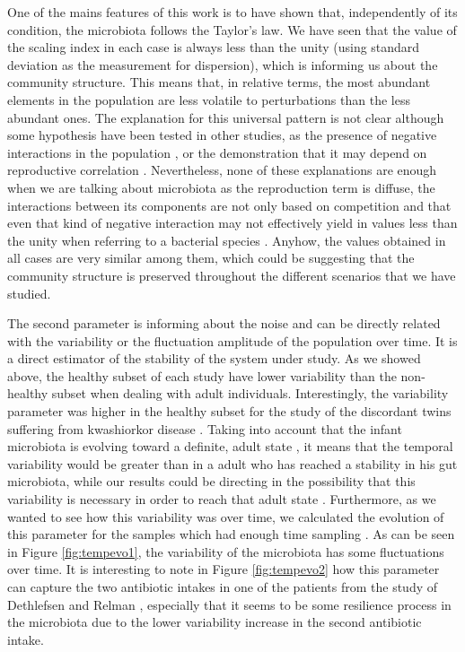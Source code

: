 One of the mains features of this work is to have shown that, independently of its condition, the microbiota follows the Taylor's law. We have seen that the value of the scaling index in each case is always less than the unity (using standard deviation as the measurement for dispersion), which is informing us about the community structure. This means that, in relative terms, the most abundant elements in the population are less volatile to perturbations than the less abundant ones. The explanation for this universal pattern is not clear although some hypothesis have been tested in other studies, as the presence of negative interactions in the population \cite{kilpatrick}, or the demonstration that it may depend on reproductive correlation \cite{ballantyne}. Nevertheless, none of these explanations are enough when we are talking about microbiota as the reproduction term is diffuse, the interactions between its components are not only based on competition \cite{joao, mehta, bucci} and that even that kind of negative interaction may not effectively yield in values less than the unity when referring to a bacterial species \cite{ramslayer}. Anyhow, the values obtained in all cases are very similar among them, which could be suggesting that the community structure is preserved throughout the different scenarios that we have studied.

The second parameter is informing about the noise and can be directly related with the variability or the fluctuation amplitude of the population over time. It is a direct estimator of the stability of the system under study. As we showed above, the healthy subset of each study have lower variability than the non-healthy subset when dealing with adult individuals. Interestingly, the variability parameter was higher in the healthy subset for the study of the discordant twins suffering from kwashiorkor disease \cite{kwashiorkor}. Taking into account that the infant microbiota is evolving toward a definite, adult state \cite{koenig}, it means that the temporal variability would be greater than in a adult who has reached a stability in his gut microbiota, while our results could be directing in the possibility that this variability is necessary in order to reach that adult state  . Furthermore, as we wanted to see how this variability was over time, we calculated the evolution of this parameter for the samples which had enough time sampling . As can be seen in Figure \ref{fig:tempevo1}, the variability of the microbiota has some fluctuations over time. It is interesting to note in Figure \ref{fig:tempevo2} how this parameter can capture the two antibiotic intakes in one of the patients from the study of Dethlefsen and Relman \cite{antibiotic}, especially that it seems to be some resilience process in the microbiota due to the lower variability increase in the second antibiotic intake.  

